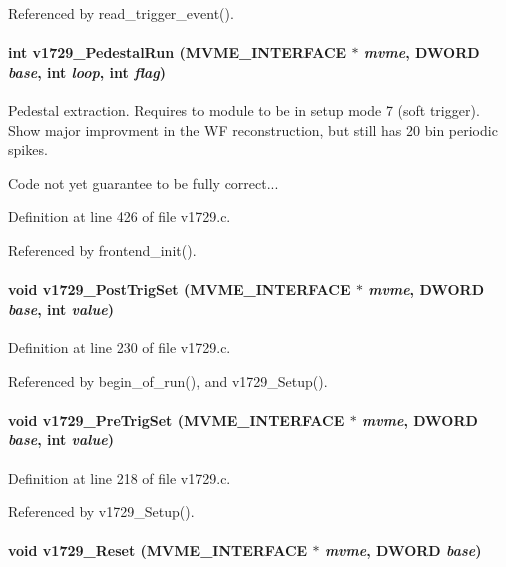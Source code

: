 Referenced by read\_\-trigger\_\-event().
\paragraph[{v1729\_\-PedestalRun}]{\setlength{\rightskip}{0pt plus 5cm}int v1729\_\-PedestalRun ({\bf MVME\_\-INTERFACE} $\ast$ {\em mvme}, \/  {\bf DWORD} {\em base}, \/  int {\em loop}, \/  int {\em flag})}\hfill\label{v1729_8c_a135c3c66398c94b6bee6cccad799cfec}
Pedestal extraction. Requires to module to be in setup mode 7 (soft trigger). Show major improvment in the WF reconstruction, but still has 20 bin periodic spikes.

Code not yet guarantee to be fully correct... 

Definition at line 426 of file v1729.c.

Referenced by frontend\_\-init().
\paragraph[{v1729\_\-PostTrigSet}]{\setlength{\rightskip}{0pt plus 5cm}void v1729\_\-PostTrigSet ({\bf MVME\_\-INTERFACE} $\ast$ {\em mvme}, \/  {\bf DWORD} {\em base}, \/  int {\em value})}\hfill\label{v1729_8c_a0c3ea27e8238bd1aa89966c08339681d}


Definition at line 230 of file v1729.c.

Referenced by begin\_\-of\_\-run(), and v1729\_\-Setup().
\paragraph[{v1729\_\-PreTrigSet}]{\setlength{\rightskip}{0pt plus 5cm}void v1729\_\-PreTrigSet ({\bf MVME\_\-INTERFACE} $\ast$ {\em mvme}, \/  {\bf DWORD} {\em base}, \/  int {\em value})}\hfill\label{v1729_8c_af7563525303a4654bb4f9eb0c7dc848c}


Definition at line 218 of file v1729.c.

Referenced by v1729\_\-Setup().
\paragraph[{v1729\_\-Reset}]{\setlength{\rightskip}{0pt plus 5cm}void v1729\_\-Reset ({\bf MVME\_\-INTERFACE} $\ast$ {\em mvme}, \/  {\bf DWORD} {\em base})}\hfill\label{v1729_8c_af17d36967203a1ea686bec0b86f149e7}


